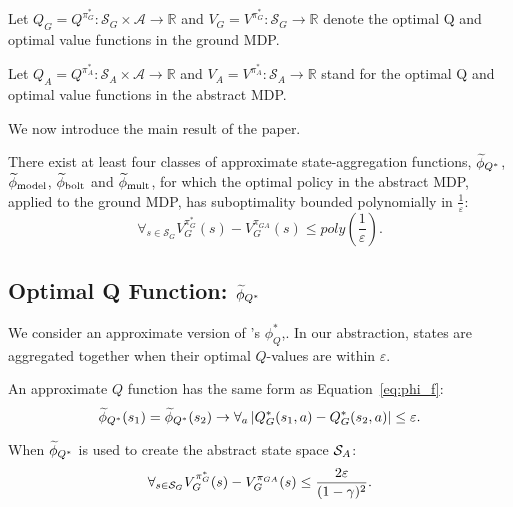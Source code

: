 Let $Q_G = Q^{\pi_G^*} : \mathcal{S}_G \times \mathcal{A} \rightarrow \mathbb{R} $ and $V_G = V^{\pi_G^*}: \mathcal{S}_G \rightarrow \mathbb{R} $ denote the optimal Q and optimal value functions in the ground \ac{MDP}.
\edefn

Let $Q_A  = Q^{\pi_A^*}: \mathcal{S}_A \times \mathcal{A} \rightarrow \mathbb{R}$ and $V_A  = V^{\pi_A^*}: \mathcal{S}_A \rightarrow \mathbb{R}$  stand for the optimal Q and optimal value functions in the abstract \ac{MDP}.
\edefn

We now introduce the main result of the paper.

\begin{thm}
There exist at least four classes of approximate state-aggregation functions, $\epQ$, $\widetilde \phi_{\text{model}}$, $\widetilde \phi_{\text{bolt}}$ and $\widetilde \phi_{\text{mult}}$, for which the optimal policy in the abstract \ac{MDP}, applied to the ground \ac{MDP}, has suboptimality bounded polynomially in $\frac{1}{\varepsilon}$:
\begin{equation}
\forall_{s \in \mathcal{S}_G} V_G^{\pi_G^*}(s) - V_G^{\pi_{GA}}(s) \leq poly \left (\frac{1}{\varepsilon} \right).
\end{equation}
\end{thm}

\subsection{Optimal Q Function: $\widetilde \phi_{Q^*}$}
\label{sec:Q*}

We consider an approximate version of \citet{li2006towards}'s $\phi_Q^*$,. In our abstraction, states are aggregated together when their optimal $Q$-values are within $\varepsilon$.

\bdefn{$\epQ$}
An approximate $Q$ function has the same form as Equation~\ref{eq:phi_f}:
\begin{equation}
\widetilde \phi_{Q^*}(s_1) = \widetilde \phi_{Q^*}(s_2) \rightarrow \forall_a \left|Q_G^*(s_1, a) - Q_G^*(s_2, a)\right| \leq \varepsilon.
\end{equation}
\edefn

\begin{lma}
\label{lma:Q*}
When $\widetilde \phi_{Q^*}$ is used to create the abstract state space $\mathcal{S}_A$:
\begin{equation}
\forall_{s \in \mathcal{S}_G} V_G^{\pi_G^*}(s) - V_G^{\pi_{GA}}(s) \leq \frac{2\varepsilon}{(1-\gamma)^2}.
\end{equation}
\end{lma}


